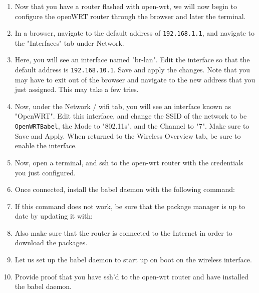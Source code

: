 \documentclass[main.tex]{subfiles}
\begin{document}
\begin{itemize}
\begin{enumerate}[noitemsep,label=$\bullet$,leftmargin=20mm,labelsep=0.5cm]
\item Now that you have a router flashed with open-wrt, we will now begin to configure the openWRT router through the browser and later the terminal. 

\item In a browser, navigate to the default address of \texttt{192.168.1.1}, and navigate to the "Interfaces" tab under Network.

\item Here, you will see an interface named "br-lan". Edit the interface so that the default address is \texttt{192.168.10.1}. Save and apply the changes. Note that you may have to exit out of the browser and navigate to the new address that you just assigned. This may take a few tries.

\item Now, under the Network / wifi tab, you will see an interface known as "OpenWRT". Edit this interface, and change the SSID of the network to be \texttt{OpenWRTBabel}, the Mode to "802.11s", and the Channel to "7". Make sure to Save and Apply. When returned to the Wireless Overview tab, be sure to enable the interface.


\item Now, open a terminal, and ssh to the open-wrt router with the credentials you just configured. 


\item Once connected, install the babel daemon with the following command:


\item If this command does not work, be sure that the package manager is up to date by updating it with:


\item Also make sure that the router is connected to the Internet in order to download the packages.

\item Let us set up the babel daemon to start up on boot on the wireless interface.


\item Provide proof that you have ssh'd to the open-wrt router and have installed the babel daemon.


\end{enumerate}
\end{itemize}
\end{document}
